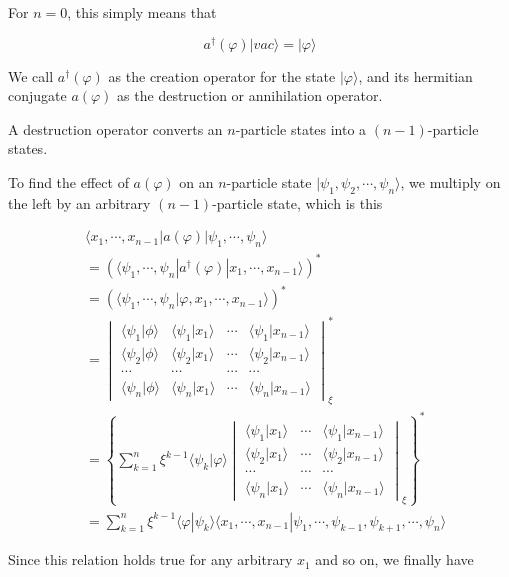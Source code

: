 ﻿\documentclass[twoside]{book}
\numberwithin{equation}{section}
\begin{document}
For $n=0$, this simply means that

\[a^\dagger(\varphi)|vac\rangle = |\varphi\rangle \]

We call $a^\dagger(\varphi)$ as the creation operator for the state $|\varphi\rangle$, and its hermitian conjugate $a(\varphi)$ as the destruction or annihilation operator. 

A destruction operator converts an $n$-particle states into a $(n-1)$-particle states. 

To find the effect of $a(\varphi)$ on an $n$-particle state $|\psi_1,\psi_2,\cdots,\psi_n\rangle$, we multiply on the left by an arbitrary $(n-1)$-particle state, which is this

\[\begin{split}
&\langle x_1,\cdots,x_{n-1}|a(\varphi)|\psi_1,\cdots,\psi_n\rangle \\
&= (\langle \psi_1,\cdots,\psi_n|a^\dagger(\varphi)|x_1,\cdots,x_{n-1}\rangle)^*\\
&= (\langle \psi_1,\cdots,\psi_n|\varphi,x_1,\cdots,x_{n-1}\rangle)^*\\
&= 
\begin{vmatrix}
\langle\psi_1|\phi\rangle & \langle\psi_1|x_1\rangle & \cdots & \langle\psi_1|x_{n-1}\rangle\\
\langle\psi_2|\phi\rangle & \langle\psi_2|x_1\rangle & \cdots & \langle\psi_2|x_{n-1}\rangle\\
\cdots & \cdots & \cdots & \cdots \\
\langle\psi_n|\phi\rangle & \langle\psi_n|x_1\rangle & \cdots & \langle\psi_n|x_{n-1}\rangle
\end{vmatrix}_{\xi}^*\\
&= \left\{\sum_{k=1}^n \xi^{k-1}\langle\psi_k|\varphi\rangle
\begin{vmatrix}
 \langle\psi_1|x_1\rangle & \cdots & \langle\psi_1|x_{n-1}\rangle\\
 \langle\psi_2|x_1\rangle & \cdots & \langle\psi_2|x_{n-1}\rangle\\
 \cdots & \cdots & \cdots \\
 \langle\psi_n|x_1\rangle & \cdots & \langle\psi_n|x_{n-1}\rangle
\end{vmatrix}_{\xi} \right\}^*\\
&= \sum_{k=1}^n \xi^{k-1}\langle\varphi|\psi_k\rangle\langle x_1,\cdots,x_{n-1}|\psi_1,\cdots,\psi_{k-1},\psi_{k+1},\cdots,\psi_n\rangle
\end{split}\]

Since this relation holds true for any arbitrary $x_1$ and so on, we finally have
\end{document}
